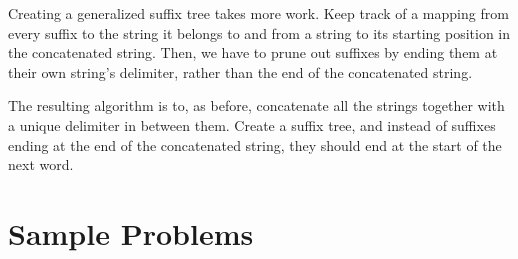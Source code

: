\documentclass[11pt, oneside]{article}
\begin{document}
Creating a generalized suffix tree takes more work.
Keep track of a mapping from every suffix to the string it belongs to
and from a string to its starting position in the concatenated string.
Then, we have to prune out suffixes by ending them at their own string's delimiter, rather than the end of the concatenated string.

The resulting algorithm is to, as before, concatenate all the strings together with a unique delimiter in between them.
Create a suffix tree, and instead of suffixes ending at the end of the concatenated string, they should end at the start of the next word.

\newpage

\section{Sample Problems}
\end{document}
